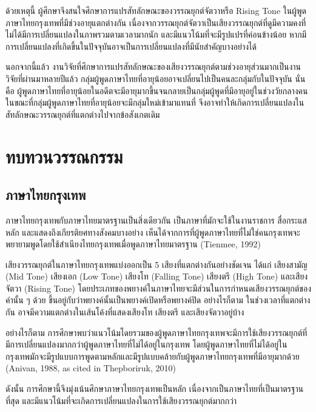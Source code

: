 \documentclass[a4paper]{article}
\begin{document}
    ด้วยเหตุนี้ ผู้ศึกษาจึงสนใจศึกษาการแปรสัทลักษณะของวรรณยุกต์จัตวาหรือ Rising Tone ในผู้พูดภาษาไทยกรุงเทพที่มีช่วงอายุแตกต่างกัน เนื่องจากวรรณยุกต์จัตวาเป็นเสียงวรรณยุกต์ที่ดูมีความคงที่ ไม่ได้มีการเปลี่ยนแปลงในภาพรวมตามเวลามากนัก และมีแนวโน้มที่จะมีรูปแปรที่ค่อนข้างน้อย หากมีการเปลี่ยนแปลงที่เกิดขึ้นในปัจจุบันอาจเป็นการเปลี่ยนแปลงที่มีนัยสำคัญบางอย่างได้

    นอกจากนี้แล้ว งานวิจัยที่ศึกษาการแปรสัทลักษณะของเสียงวรรณยุกต์ตามช่วงอายุส่วนมากเป็นงานวิจัยที่ผ่านมาหลายปีแล้ว กลุ่มผู้พูดภาษาไทยที่อายุน้อยอาจเปลี่ยนไปเป็นคนละกลุ่มกับในปัจจุบัน นั่นคือ ผู้พูดภาษาไทยที่อายุน้อยในอดีตจะมีอายุมากขึ้นจนกลายเป็นกลุ่มผู้พูดที่มีอายุอยู่ในช่วงวัยกลางคน ในขณะที่กลุ่มผู้พูดภาษาไทยที่อายุน้อยจะมีกลุ่มใหม่เข้ามาแทนที่ จึงอาจทำให้เกิดการเปลี่ยนแปลงในสัทลักษณะวรรณยุกต์ที่แตกต่างไปจากข้อสังเกตเดิม
\section{ทบทวนวรรณกรรม}
\subsection{ภาษาไทยกรุงเทพ}
    ภาษาไทยกรุงเทพกับภาษาไทยมาตรฐานเป็นสิ่งเดียวกัน เป็นภาษาที่มักจะใช้ในงานราชการ สื่อกระแสหลัก และแสดงถึงเกียรติยศทางสังคมบางอย่าง เห็นได้จากการที่ผู้พูดภาษาไทยที่ไม่ใช่คนกรุงเทพจะพยายามพูดโดยใช้สำเนียงไทยกรุงเทพเมื่อพูดภาษาไทยมาตรฐาน (Tienmee, 1992)

    เสียงวรรณยุกต์ในภาษาไทยกรุงเทพแบ่งออกเป็น 5 เสียงที่แตกต่างกันอย่างชัดเจน ได้แก่ เสียงสามัญ (Mid Tone) เสียงเอก (Low Tone) เสียงโท (Falling Tone) เสียงตรี (High Tone) และเสียงจัตวา (Rising Tone) โดยประเภทของพยางค์ในภาษาไทยจะมีส่วนในการกำหนดเสียงวรรณยุกต์ของคำนั้น ๆ ด้วย ขึ้นอยู่กับว่าพยางค์นั้นเป็นพยางค์เปิดหรือพยางค์ปิด อย่างไรก็ตาม ในช่วงเวลาที่แตกต่างกัน อาจมีความแตกต่างในเส้นโค้งที่แสดงเสียงโท เสียงตรี และเสียงจัตวาอยู่บ้าง

    อย่างไรก็ตาม การศึกษาพบว่าแนวโน้มโดยรวมของผู้พูดภาษาไทยกรุงเทพจะมีการใช้เสียงวรรณยุกต์ที่มีการเปลี่ยนแปลงมากกว่าผู้พูดภาษาไทยที่ไม่ได้อยู่ในกรุงเทพ โดยผู้พูดภาษาไทยที่ไม่ได้อยู่ในกรุงเทพมักจะมีรูปแบบการพูดตามหลักและมีรูปแบบคล้ายกับผู้พูดภาษาไทยกรุงเทพที่มีอายุมากด้วย (Anivan, 1988, as cited in Thepboriruk, 2010)

    ดังนั้น การศึกษานี้จึงมุ่งเน้นศึกษาภาษาไทยกรุงเทพเป็นหลัก เนื่องจากเป็นภาษาไทยที่เป็นมาตรฐานที่สุด และมี\break แนวโน้มที่จะเกิดการเปลี่ยนแปลงในการใช้เสียงวรรณยุกต์มากกว่า
\end{document}
